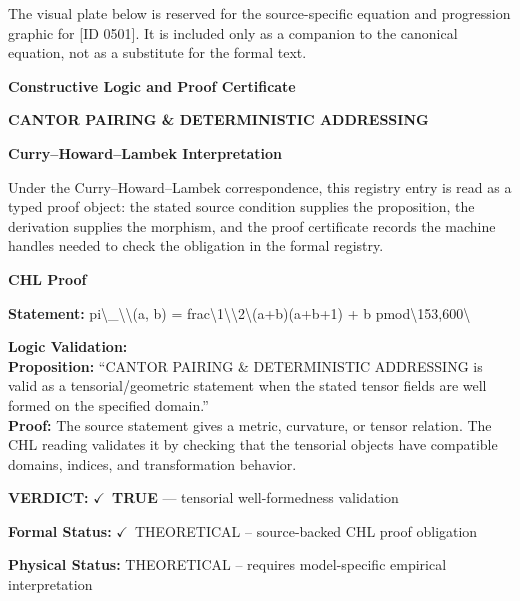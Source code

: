 \begingroup\footnotesize\sloppy
The visual plate below is reserved for the source-specific equation and progression graphic for [ID 0501]. It is included only as a companion to the canonical equation, not as a substitute for the formal text.
\par\endgroup
\ifTZPDarkEdition
{}
\fi

\clearpage
\begingroup\tzpsupportsetup
\noindent\textbf{\fontsize{10.8pt}{12.8pt}\selectfont [ID 0501] Constructive Logic and Proof Certificate}\par
\noindent\textbf{\fontsize{10pt}{12pt}\selectfont CANTOR PAIRING \& DETERMINISTIC ADDRESSING}\par
\vspace{0.45em}
\begingroup
\footnotesize
\setlength{\parskip}{0.22em}
\setlength{\parindent}{0pt}
\noindent\textbf{Curry--Howard--Lambek Interpretation}\par
Under the Curry--Howard--Lambek correspondence, this registry entry is read as a typed proof
object: the stated source condition supplies the proposition, the derivation supplies the
morphism, and the proof certificate records the machine handles needed to check the obligation
in the formal registry.

\vspace{0.45em}
\noindent\textbf{CHL Proof}\par
\textbf{Statement:} pi\textbackslash{}\_\textbackslash{}\textbackslash{}(a, b) = frac\textbackslash{}1\textbackslash{}\textbackslash{}2\textbackslash{}(a+b)(a+b+1) + b pmod\textbackslash{}153,600\textbackslash{}

\textbf{Logic Validation:}\\
\textbf{Proposition:} ``CANTOR PAIRING \& DETERMINISTIC ADDRESSING is valid as a tensorial/geometric statement
when the stated tensor fields are well formed on the specified domain.''\\
\textbf{Proof:} The source statement gives a metric, curvature, or tensor relation. The CHL reading
validates it by checking that the tensorial objects have compatible domains, indices,
and transformation behavior.

\textbf{VERDICT:} \ensuremath{\checkmark}\ \textbf{TRUE} --- tensorial well-formedness validation

\textbf{Formal Status:} \ensuremath{\checkmark}\ THEORETICAL -- source-backed CHL proof obligation

\textbf{Physical Status:} THEORETICAL -- requires model-specific empirical interpretation
\par\vspace{0.45em}
\par
\ifTZPDarkEdition
{}
\fi
\endgroup
\endgroup
